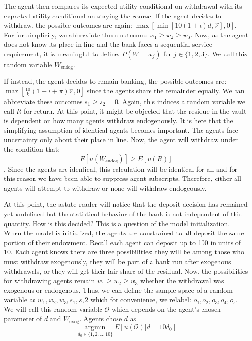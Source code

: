 \documentclass[12pt]{article}
\begin{document}
\begin{doublespace}
The agent then compares its expected utility conditional on withdrawal with its expected utility conditional on staying the course. If the agent decides to withdraw, the possible outcomes are again: $\max\left[\min\left[10\left(1+\iota\right)d,\mathcal{V}\right],0\right]$. For for simplicity, we abbreviate these outcomes $w_{1} \geq w_{2} \geq w_{3}$. Now, as the agent does not know its place in line and the bank faces a sequential service requirement, it is meaningful to define:
$P\left(W=w_{j}\right)$ for $j \in \{1,2,3\}$. We call this random variable $W_{\mathrm{endog}}$.

If instead, the agent decides to remain banking, the possible outcomes are: $\max\left[\frac{10}{k}\left(1+\iota + \pi\right)\mathcal{V},0\right]$ since the agents share the remainder equally. We can abbreviate these outcomes $s_1 \geq s_2=0$. Again, this induces a random variable we call $R$ for return.  At this point, it might be objected that the residue in the vault is dependent on how many agents withdraw endogenously. It is here that the simplifying assumption of identical agents becomes important. The agents face uncertainty only about their place in line. Now, the agent will withdraw under the condition that:
$$E\left[u\left(W_{\mathrm{endog}}\right)\right]  \geq E\left[u\left(R\right)\right]$$. Since the agents are identical, this calculation will be identical for all and for this reason we have been able to suppress agent subscripts. Therefore, either all agents will attempt to withdraw or none will withdraw endogeously. 

At this point, the astute reader will notice that the deposit decision has remained yet undefined but the statistical behavior of the bank is not independent of this quantity. How is this decided? This is a question of the model initialization. When the model is initialized, the agents are constrained to all deposit the same portion of their endowment. Recall each agent can deposit up to 100 in units of 10. Each agent knows there are three possibilities: they will be among those who must withdraw exogenously, they will be part of a bank run after exogenous withdrawals, or they will get their fair share of the residual. Now, the possibilities for withdrawing agents remain $w_{1} \geq w_{2} \geq w_{3}$ whether the withdrawal was exogenous or endogenous. Thus, we can define the sample space of a random variable as $w_{1},  w_{2},  w_{3},s_1,s,2$ which for convenience, we relabel: $o_1,o_2,o_3,o_4,o_5$. We will call this random variable $\mathcal{O}$ which depends on the agent's chosen parameter of $d$ and $W_{\mathrm{exog}}$. Agents chose $d$ as 
$$\operatorname*{argmin}_{d_{0} \in \{1,2,\ldots,10\}}E\left[u\left(\mathcal{O}\right)\left|d=10d_{0}\right.\right]$$


\end{doublespace}
\end{document}
